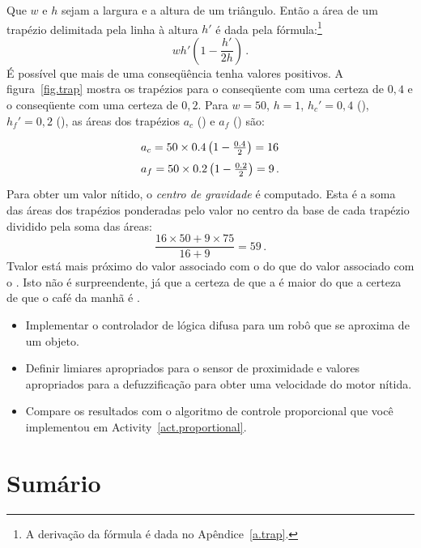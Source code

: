 Que $w$ e $h$ sejam a largura e a altura de um triângulo. Então a área de um trapézio delimitada pela linha à altura $h'$ é dada pela fórmula:\footnote{A derivação da fórmula é dada no Apêndice~\ref{a.trap}.}
\begin{displaymath}
wh'\left(1-\frac{h'}{2h}\right)\,.
\end{displaymath}
É possível que mais de uma conseqüência tenha valores positivos. A figura~\ref{fig.trap} mostra os trapézios para o conseqüente  com uma certeza de $0,4$ e o conseqüente  com uma certeza de $0,2$. Para $w=50$, $h=1$, $h_{c}'=0,4$ (), $h_{f}'=0,2$ (), as áreas dos trapézios $a_c$ () e $a_f$ () são:
\begin{displaymath}
\spacearray
\begin{array}{l}
a_c = 50\times 0.4 \left(1 - \frac{0.4}{2}\right) = 16\\
a_f = 50\times 0.2 \left(1 - \frac{0.2}{2}\right) = 9\,.
\end{array}
\end{displaymath}
Para obter um valor nítido, o \emph{centro de gravidade} é computado. Esta é a soma das áreas dos trapézios ponderadas pelo valor no centro da base de cada trapézio dividido pela soma das áreas:
\begin{displaymath}
\frac{16\times 50 + 9\times 75}{16+9}=59\,.
\end{displaymath}
Tvalor está mais próximo do valor associado com o  do que do valor associado com o . Isto não é surpreendente, já que a certeza de que a  é maior do que a certeza de que o café da manhã é .

\begin{framed}
\begin{itemize}
\item Implementar o controlador de lógica difusa para um robô que se aproxima de um objeto.
\item Definir limiares apropriados para o sensor de proximidade e valores apropriados para a defuzzificação para obter uma velocidade do motor nítida.
\item Compare os resultados com o algoritmo de controle proporcional que você implementou em Activity~\ref{act.proportional}.
\end{itemize}
\end{framed}

\section{Sumário}

